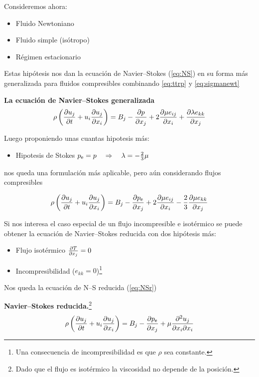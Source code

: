 Consideremos ahora:
\begin{itemize}
\item Fluido Newtoniano
\item Fluido simple (isótropo)
\item Régimen estacionario
\end{itemize}
Estas hipótesis nos dan la ecuación de Navier--Stokes (\ref{eq:NS}) en su forma más generalizada para fluidos compresibles combinando \ref{eq:ttrp} y \ref{eq:sigmanewt}
\begin{mdframed}
\textbf{La ecuación de Navier--Stokes generalizada}
\begin{equation} \label{eq:NS}
     \rho \left( \frac{\partial u_j}{\partial t}+u_i \frac{\partial u_j}{\partial x_i}\right)=B_j-\frac{\partial p}{\partial x_j}+2\frac{\partial \mu e_{ij}}{\partial x_i}+\frac{\partial \lambda e_{kk} }{\partial x_j}
\end{equation}
\end{mdframed}

Luego proponiendo unas cuantas hipotesis más:
\begin{itemize}
\item Hipotesis de Stokes $\pe=p\quad\Rightarrow\quad\lambda = -\frac{2}{3}\mu$
\end{itemize}
nos queda una formulación más aplicable, pero aún considerando flujos compresibles

\begin{equation}\label{eq:NS_stokesHipotesis}
     \rho \left( \spartial{u_j}{t}+u_i \spartial{u_j}{x_i}\right)=B_j-\spartial{\pe}{x_j}+2\spartial{\mu e_{ij}}{x_i}-\frac{2}{3}\spartial{\mu e_{kk}}{x_j}
\end{equation}

Si nos interesa el caso especial de un flujo incompresible e isotérmico se puede obtener la ecuación de Navier--Stokes reducida con dos hipótesis más:
\begin{itemize}
    \item Flujo isotérmico $\frac{\partial T}{\partial x_j}=0$
    \item Incompresibilidad ($e_{kk}=0$)\footnote{Una consecuencia de incompresibilidad es que $\rho$ sea constante.}
\end{itemize}
Nos queda la ecuación de N--S reducida (\ref{eq:NSr})
\begin{mdframed}
\textbf{Navier--Stokes reducida.}\footnote{Dado que el flujo es isotérmico la viscosidad no depende de la posición.}
\begin{equation}\label{eq:NSr}
\rho \left( \spartial{u_j}{t} +u_i \spartial{u_j}{x_i}\right)=B_j-\spartial{\pe}{x_j} +\mu \spartial{^2 u_j}{x_i\partial x_i}
\end{equation}
\end{mdframed}



